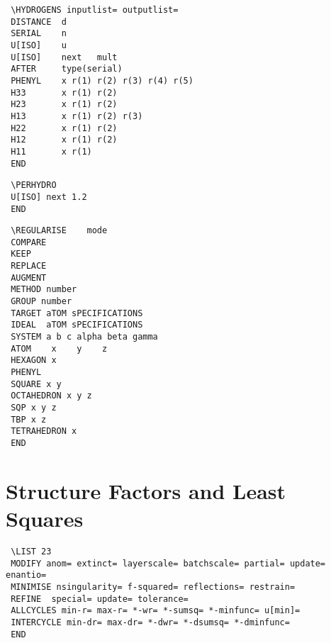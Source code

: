 \documentclass[10pt,a4paper]{report}
\begin{document}
\bigskip{}



\small\begin{verbatim}
 \HYDROGENS inputlist= outputlist=
 DISTANCE  d
 SERIAL    n
 U[ISO]    u
 U[ISO]    next   mult
 AFTER     type(serial)
 PHENYL    x r(1) r(2) r(3) r(4) r(5)
 H33       x r(1) r(2)
 H23       x r(1) r(2)
 H13       x r(1) r(2) r(3)
 H22       x r(1) r(2)
 H12       x r(1) r(2)
 H11       x r(1)
 END
\end{verbatim}\normalsize




\bigskip{}



\small\begin{verbatim}
 \PERHYDRO
 U[ISO] next 1.2
 END
\end{verbatim}\normalsize

\bigskip{}



\small\begin{verbatim}
 \REGULARISE    mode
 COMPARE
 KEEP
 REPLACE
 AUGMENT
 METHOD number
 GROUP number
 TARGET aTOM sPECIFICATIONS
 IDEAL  aTOM sPECIFICATIONS
 SYSTEM a b c alpha beta gamma
 ATOM    x    y    z
 HEXAGON x
 PHENYL
 SQUARE x y
 OCTAHEDRON x y z
 SQP x y z
 TBP x z
 TETRAHEDRON x
 END
\end{verbatim}\normalsize


\section{Structure Factors and Least Squares}


\bigskip{}



\small\begin{verbatim}
 \LIST 23
 MODIFY anom= extinct= layerscale= batchscale= partial= update= enantio=
 MINIMISE nsingularity= f-squared= reflections= restrain=
 REFINE  special= update= tolerance=
 ALLCYCLES min-r= max-r= *-wr= *-sumsq= *-minfunc= u[min]=
 INTERCYCLE min-dr= max-dr= *-dwr= *-dsumsq= *-dminfunc=
 END
\end{verbatim}\normalsize




\bigskip{}
\end{document}
